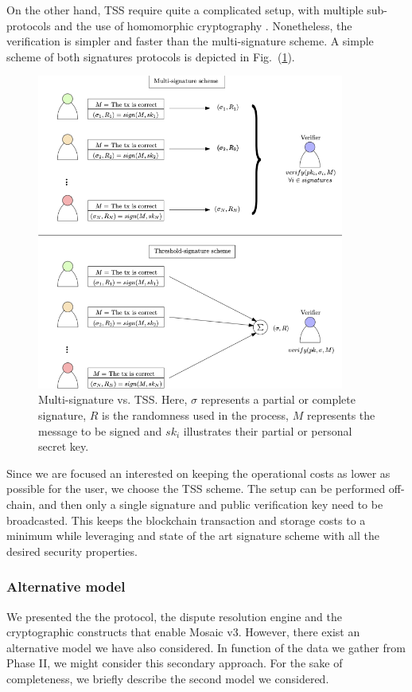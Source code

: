 On the other hand, TSS  require quite a complicated setup, with multiple sub-protocols and the use of homomorphic cryptography \cite{Moore2014PracticalSurvey}. Nonetheless, the verification is simpler and faster than the multi-signature scheme. A simple scheme of both signatures protocols is depicted in Fig.~(\ref{fig:signatures}).

\begin{figure}[H]
    \centering
    \includegraphics[width=0.9\textwidth]{images/mosaic/phase3/signatures.png}
    \caption{Multi-signature vs. TSS. Here, $\sigma$ represents a partial or complete signature, $R$ is the randomness used in the process, $M$ represents the message to be signed and $sk_i$ illustrates their partial or personal secret key.}
    \label{fig:signatures}
\end{figure}


Since we are focused an interested on keeping the operational costs as lower as possible for the user, we choose the TSS scheme. The setup can be performed off-chain, and then only a single signature and public verification key need to be broadcasted. This keeps the blockchain transaction and storage costs to a minimum while leveraging and state of the art signature scheme with all the desired security properties.


\subsubsection{Alternative model}
We presented the the protocol, the dispute resolution engine and the cryptographic constructs that enable Mosaic v3. However, there exist an alternative model we have also considered. In function of the data we gather from Phase II, we might consider this secondary approach. For the sake of completeness, we briefly describe the second model we considered.

